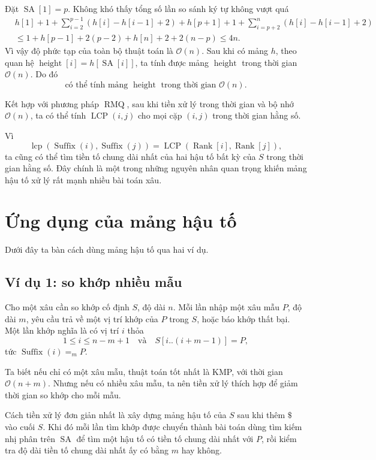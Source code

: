 \documentclass[11pt]{article}
\newcommand{\Oh}{\mathcal{O}}
\newcommand{\SA}{\operatorname{SA}}
\newcommand{\Rank}{\operatorname{Rank}}
\newcommand{\Height}{\operatorname{height}}
\newcommand{\Suf}{\operatorname{Suffix}}
\newcommand{\LCP}{\operatorname{LCP}}
\newcommand{\lcp}{\operatorname{lcp}}
\newcommand{\RMQ}{\operatorname{RMQ}}
\begin{document}
Đặt \(\SA[1]=p\). Không khó thấy tổng số lần so sánh ký tự không vượt quá
\[
\begin{aligned}
&h[1]+1+\sum_{i=2}^{p-1}(h[i]-h[i-1]+2)
  +h[p+1]+1+\sum_{i=p+2}^{n}(h[i]-h[i-1]+2)\\
&\le 1+h[p-1]+2(p-2)+h[n]+2+2(n-p)\le 4n.
\end{aligned}
\]
Vì vậy độ phức tạp của toàn bộ thuật toán là \(\Oh(n)\). Sau khi có mảng
\(h\), theo quan hệ \(\Height[i]=h[\SA[i]]\), ta tính được mảng \(\Height\)
trong thời gian \(\Oh(n)\). Do đó
\[
  \text{có thể tính mảng \(\Height\) trong thời gian \(\Oh(n)\).}
\]

Kết hợp với phương pháp \(\RMQ\), sau khi tiền xử lý trong thời gian và bộ
nhớ \(\Oh(n)\), ta có thể tính \(\LCP(i,j)\) cho mọi cặp \((i,j)\) trong thời
gian hằng số.

Vì
\[
  \lcp(\Suf(i),\Suf(j))=\LCP(\Rank[i],\Rank[j]),
\]
ta cũng có thể tìm tiền tố chung dài nhất của hai hậu tố bất kỳ của \(S\)
trong thời gian hằng số. Đây chính là một trong những nguyên nhân quan trọng
khiến mảng hậu tố xử lý rất mạnh nhiều bài toán xâu.

\section{Ứng dụng của mảng hậu tố}

Dưới đây ta bàn cách dùng mảng hậu tố qua hai ví dụ.

\subsection{Ví dụ 1: so khớp nhiều mẫu}

Cho một xâu cần so khớp cố định \(S\), độ dài \(n\). Mỗi lần nhập một xâu mẫu
\(P\), độ dài \(m\), yêu cầu trả về một vị trí khớp của \(P\) trong \(S\),
hoặc báo khớp thất bại. Một lần khớp nghĩa là có vị trí \(i\) thỏa
\[
  1\le i\le n-m+1
  \quad\text{và}\quad
  S[i..(i+m-1)]=P,
\]
tức \(\Suf(i)=_m P\).

Ta biết nếu chỉ có một xâu mẫu, thuật toán tốt nhất là KMP, với thời gian
\(\Oh(n+m)\). Nhưng nếu có nhiều xâu mẫu, ta nên tiền xử lý thích hợp để giảm
thời gian so khớp cho mỗi mẫu.

Cách tiền xử lý đơn giản nhất là xây dựng mảng hậu tố của \(S\) sau khi thêm
\(\texttt{\$}\) vào cuối \(S\). Khi đó mỗi lần tìm khớp được chuyển thành bài
toán dùng tìm kiếm nhị phân trên \(\SA\) để tìm một hậu tố có tiền tố chung
dài nhất với \(P\), rồi kiểm tra độ dài tiền tố chung dài nhất ấy có bằng
\(m\) hay không.
\end{document}
